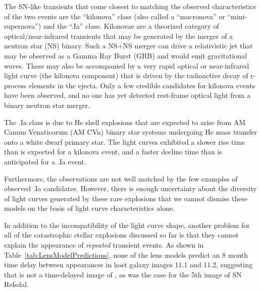 The SN-like transients that come closest to matching the observed
characteristics of the two \spock events are the ``kilonova'' class
(also called a ``macronova'' or ``mini-supernova'') and the ``.Ia''
class.  Kilonovae are a theorized category of optical/near-infrared
transients that may be generated by the merger of a neutron star (NS)
binary. Such a NS+NS merger can drive a relativistic jet that may be
observed as a Gamma Ray Burst (GRB) and would emit gravitational
waves.  These may also be accompanied by a very rapid optical or
near-infrared light curve (the kilonova component) that is driven by
the radioactive decay of r-process elements in the ejecta\cite{Li:1998,Kulkarni:2005}.  Only a few credible candidates for
kilonova events have been observed, and no one has yet detected
rest-frame optical light from a binary neutron star merger\cite{Perley:2009,Tanvir:2013}.

The .Ia class is due to He shell explosions that are expected to arise
from AM Canum Venaticorum (AM CVn) binary star systems undergoing He
mass transfer onto a white dwarf primary star\cite{Warner:1995,
  Nelemans:2005,Bildsten:2007}.  The \spock light curves exhibited a
slower rise time than is expected for a kilonova event\cite{Metzger:2010,Barnes:2013,Kasen:2015}, and a faster
decline time than is anticipated for a .Ia event\cite{Shen:2010}.

Furthermore, the \spock observations are not
well matched by the few examples of observed .Ia candidates\cite{Kasliwal:2010, Perets:2010, Poznanski:2010}.  However, there is
enough uncertainty about the diversity of light curves generated by
these rare explosions that we cannot dismiss these models on the
basis of light curve characteristics alone.

In addition to the incompatibility of the light curve shape, another
problem for all of the catastrophic stellar explosions discussed so
far is that they cannot explain the appearance of {\it repeated}
transient events.  As shown in Table~\ref{tab:LensModelPredictions},
none of the  lens models predict an 8 month time delay
between appearances in host galaxy images 11.1 and 11.2, suggesting
that \spocktwo is not a time-delayed image of \spockone, as was the
case for the 5th image of SN Refsdal\cite{Kelly:2015a,Kelly:2016a}.

